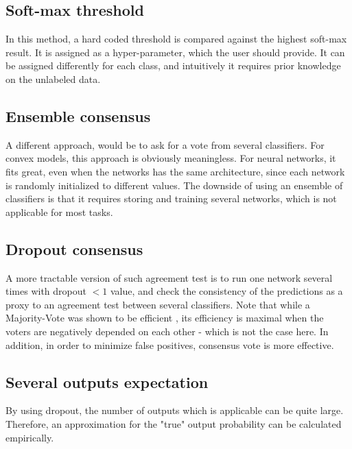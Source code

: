 \documentclass[conference, letterpaper]{IEEEtran}
\begin{document}
\subsection{Soft-max threshold}
In this method, a hard coded threshold is compared against the highest soft-max result. It is assigned as a hyper-parameter, which the user should provide. It can be assigned differently for each class, and intuitively it requires prior knowledge on the unlabeled data.

\subsection{Ensemble consensus}
A different approach, would be to ask for a vote from several classifiers. 
For convex models, this approach is obviously meaningless. For neural networks, it fits great, even when the networks has the same architecture, since each network is randomly initialized to different values. The downside of using an ensemble of classifiers is that it requires storing and training several networks, which is not applicable for most tasks.

\subsection{Dropout consensus} 
A more tractable version of such agreement test is to run one network several times with dropout $<1$ value, and check the consistency of the predictions as a proxy to an agreement test between several classifiers. Note that while a Majority-Vote was shown to be efficient \cite{kuncheva2003limits}, its efficiency is maximal when the voters are negatively depended on each other - which is not the case here. In addition, in order to minimize false positives, consensus vote is more effective.

\subsection{Several outputs expectation}
By using dropout, the number of outputs which is applicable can be quite large. Therefore, an approximation for the "true" output probability can be calculated empirically.
\end{document}
